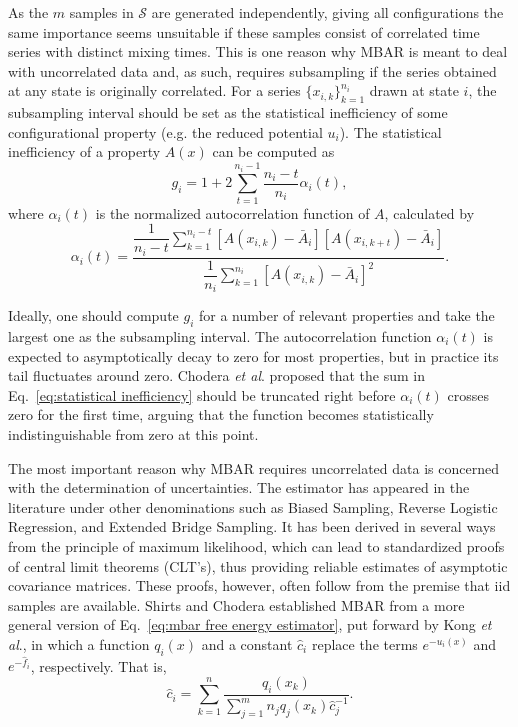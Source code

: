 \documentclass[aip,jcp,preprint,amsmath,amssymb]{revtex4-1}
\begin{document}
As the $m$ samples in $\mathcal S$ are generated independently, giving all configurations the same importance seems unsuitable if these samples consist of correlated time series with distinct mixing times. This is one reason why MBAR is meant to deal with uncorrelated data and, as such, requires subsampling if the series obtained at any state is originally correlated.\cite{Shirts_2008} For a series $\{x_{i,k}\}_{k=1}^{n_i}$ drawn at state $i$, the subsampling interval should be set as the statistical inefficiency of some configurational property (e.g. the reduced potential $u_i$). The statistical inefficiency of a property $A(x)$ can be computed as\cite{Chodera_2007}
\begin{equation}
\label{eq:statistical inefficiency}
g_i = 1 + 2 \sum\limits_{t=1}^{n_i-1} \frac{n_i - t}{n_i} \alpha_i(t),
\end{equation}
where $\alpha_i(t)$ is the normalized autocorrelation function of $A$, calculated by
\begin{equation*}
\alpha_i(t) = \frac{\dfrac{1}{n_i - t} \sum\limits_{k=1}^{n_i-t} [A(x_{i,k}) - \bar A_i][A(x_{i,k+t}) - \bar A_i]}{\dfrac{1}{n_i} \sum\limits_{k=1}^{n_i} [A(x_{i,k}) - \bar A_i]^2}.
\end{equation*}

Ideally, one should compute $g_i$ for a number of relevant properties and take the largest one as the subsampling interval.\cite{Shirts_2008} The autocorrelation function $\alpha_i(t)$ is expected to asymptotically decay to zero for most properties, but in practice its tail fluctuates around zero. Chodera \textit{et al}.\cite{Chodera_2007} proposed that the sum in Eq.~\eqref{eq:statistical inefficiency} should be truncated right before $\alpha_i(t)$ crosses zero for the first time, arguing that the function becomes statistically indistinguishable from zero at this point.

The most important reason why MBAR requires uncorrelated data is concerned with the determination of uncertainties. The estimator has appeared in the literature under other denominations such as Biased Sampling,\cite{Vardi_1985, *Gill_1988} Reverse Logistic Regression,\cite{Geyer_1994} and Extended Bridge Sampling.\cite{Meng_1996, Kong_2003, Tan_2004} It has been derived in several ways from the principle of maximum likelihood, which can lead to standardized proofs of central limit theorems (CLT's), thus providing reliable estimates of asymptotic covariance matrices.\cite{Pawitan_2001, Greene_2012} These proofs, however, often follow from the premise that iid samples are available. Shirts and Chodera\cite{Shirts_2008} established MBAR from a more general version of Eq.~\eqref{eq:mbar free energy estimator}, put forward by Kong \textit{et al}.,\cite{Kong_2003} in which a function $q_i(x)$ and a constant $\hat c_i$ replace the terms $e^{-u_i(x)}$ and $e^{-\hat f_i}$, respectively. That is,
\begin{equation}
\label{eq:kong et al estimator}
\hat c_i = \sum_{k=1}^n \frac{q_i(x_k)}{\sum_{j=1}^m n_j q_j(x_k) \hat c_j^{-1}}.
\end{equation}
\end{document}
